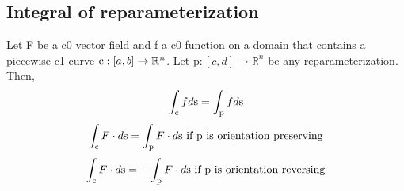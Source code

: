 \begin{comment}
\subsection*{Surface reparametrization}
Let $\Phi:D\subset \mathbb{R}^2\to \mathbb{R}^n$, $n\geq 3$ be a function. The surface is $S=\Phi(D)$ where
$$\Phi(u,v) = (x_1(u,v),\ldots, x_n(u,v))$$

\subsubsection*{Surface reparameterization of a plane given 3 points}
\begin{itemize}
    \item Points to 2 vectors, find the normal. Then, choose any of the points and plug in normal.
    $$\textrm{n}=\textrm{u}\times \textrm{v}$$
    $$0=n_x(x-x_0) + n_y(y-y_0) + n_z(z-z_0)$$
    \item Point plus linear combination of span of two vectors.
    $$[x,y,z]^T = \textrm{p}+s\textrm{u}+t\textrm{v}$$
\end{itemize}

\subsubsection*{Tangent vector of surface reparameterization}
$$T_u = \frac{\partial \Phi}{\partial u}(u_0, v_0) = \langle\frac{\partial x}{\partial u}(u_0, v_0), \frac{\partial y}{\partial u}(u_0, v_0), \frac{\partial z}{\partial u}(u_0, v_0)\rangle$$
$$T_v = \frac{\partial \Phi}{\partial v}(u_0, v_0) = \langle\frac{\partial x}{\partial v}(u_0, v_0), \frac{\partial y}{\partial v}(u_0, v_0), \frac{\partial z}{\partial v}(u_0, v_0)\rangle$$
Again, we can take the dot product to get the tangent plane.
$$N = T_{u_0} \times T_{v_0},~N \neq 0$$
$$N_x(x-x_0) + N_y(y-y_0) + N_z(z-z_0)=0$$
The reason why we test for $N\neq 0$ is to test for smoothness.
\end{comment}


\subsection*{Integral of reparameterization}
Let F be a c0 vector field and f a c0 function on a domain that contains a piecewise c1 curve $\textrm{c}:[a,b]\to\mathbb{R}^n$. Let $\textrm{p}:[c,d]\to\mathbb{R}^n$ be any reparameterization. Then,
$$\int_{\textrm{c}}f d\textrm{s} = \int_{\textrm{p}}f d\textrm{s}$$
$$\int_{\textrm{c}}F \cdot d\textrm{s} = \int_{\textrm{p}}F \cdot d\textrm{s} \textrm{ if p is orientation preserving}$$
$$\int_{\textrm{c}}F \cdot d\textrm{s} = -\int_{\textrm{p}}F \cdot d\textrm{s} \textrm{ if p is orientation reversing}$$


